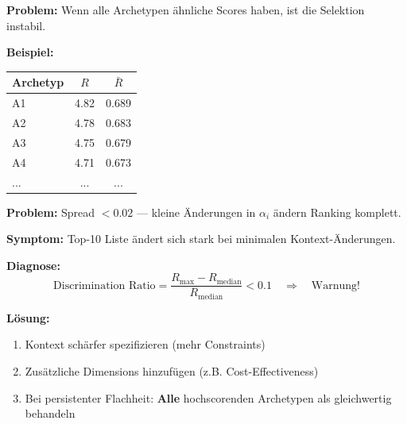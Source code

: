 \begin{tcolorbox}[colback=red!5!white, colframe=red!75!black,
    title=\textbf{Failure Mode 3: Flache Score-Verteilung}]

\textbf{Problem:} Wenn alle Archetypen ähnliche Scores haben, ist die Selektion instabil.

\medskip
\textbf{Beispiel:}
\begin{center}
\begin{tabular}{@{}lcc@{}}
\toprule
\textbf{Archetyp} & $R$ & $\bar{R}$ \\
\midrule
A1 & 4.82 & 0.689 \\
A2 & 4.78 & 0.683 \\
A3 & 4.75 & 0.679 \\
A4 & 4.71 & 0.673 \\
... & ... & ... \\
\bottomrule
\end{tabular}
\end{center}

\textbf{Problem:} Spread $< 0.02$ --- kleine Änderungen in $\alpha_i$ ändern Ranking komplett.

\medskip
\textbf{Symptom:} Top-10 Liste ändert sich stark bei minimalen Kontext-Änderungen.

\textbf{Diagnose:}
\begin{equation*}
\text{Discrimination Ratio} = \frac{R_{\text{max}} - R_{\text{median}}}{R_{\text{median}}} < 0.1 \quad \Rightarrow \quad \text{Warnung!}
\end{equation*}

\textbf{Lösung:}
\begin{enumerate}[nosep]
    \item Kontext schärfer spezifizieren (mehr Constraints)
    \item Zusätzliche Dimensions hinzufügen (z.B. Cost-Effectiveness)
    \item Bei persistenter Flachheit: \textbf{Alle} hochscorenden Archetypen als gleichwertig behandeln
\end{enumerate}

\end{tcolorbox}

